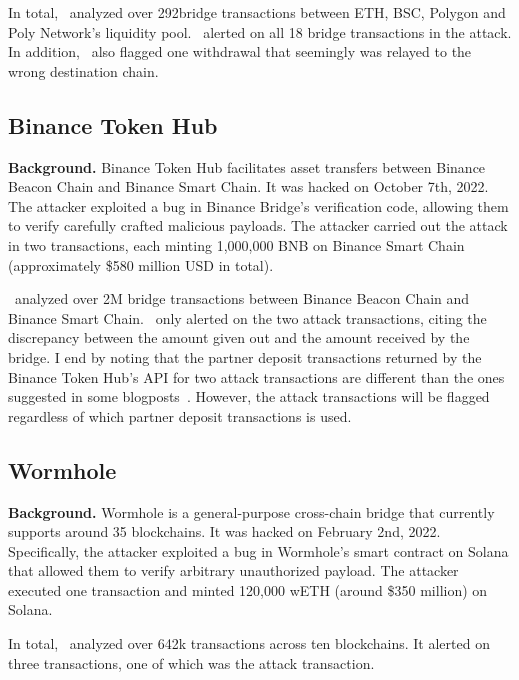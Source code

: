  In total, \offlinetool~analyzed over 292\thou bridge transactions between ETH, BSC, Polygon and Poly Network's liquidity pool. \offlinetool~alerted on all 18 bridge transactions in the attack. In addition, \offlinetool~also flagged one withdrawal that seemingly was relayed to the wrong destination chain.

\subsection{Binance Token Hub}
\textbf{Background.} Binance Token Hub
facilitates asset transfers between Binance Beacon Chain and Binance Smart Chain. It was hacked on
October 7th, 2022. The attacker exploited a bug in Binance Bridge's verification code, allowing them to verify carefully crafted malicious payloads. The attacker carried out the attack in two transactions, each minting 1,000,000 BNB on Binance Smart Chain (approximately \$580 million USD in total).

 \offlinetool~analyzed over 2M bridge transactions between 
Binance Beacon Chain and Binance Smart Chain. 
\offlinetool~only alerted on the two attack transactions, citing the discrepancy between the amount given out and the amount received by the bridge. I end by noting that the partner deposit transactions returned by the Binance Token Hub's API for two attack transactions are different than the ones suggested in some blogposts~\cite{binanceproof:online}. However, the attack transactions will be flagged regardless of which partner deposit transactions is used.


\subsection{Wormhole}
\textbf{Background.} 
Wormhole is a general-purpose cross-chain bridge that 
currently supports around 35 blockchains. It was hacked on February 2nd, 2022. Specifically, the attacker exploited a bug in Wormhole's smart contract on Solana that allowed them to verify arbitrary unauthorized payload. The attacker executed one transaction and minted 120,000 wETH (around \$350 million) on Solana.


In total, \offlinetool~analyzed over 642k transactions across ten blockchains. It alerted on three transactions, one of which was the attack transaction. 


